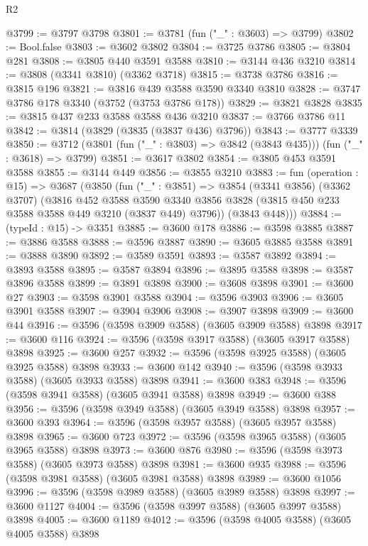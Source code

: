 \begin{lexlean}{R2}
\begin{coremodule}
@3799 := @3797 @3798
@3801 := @3781 (fun ("_" : @3603) => @3799)
@3802 := Bool.false
@3803 := @3602 @3802
@3804 := @3725 @3786
@3805 := @3804 @281
@3808 := @3805 @440 @3591 @3588
@3810 := @3144 @436 @3210
@3814 := @3808 (@3341 @3810) (@3362 @3718)
@3815 := @3738 @3786
@3816 := @3815 @196
@3821 := @3816 @439 @3588 @3590 @3340 @3810
@3828 := @3747 @3786 @178 @3340 (@3752 (@3753 @3786 @178))
@3829 := @3821 @3828
@3835 := @3815 @437 @233 @3588 @3588 @436 @3210
@3837 := @3766 @3786 @11
@3842 := @3814 (@3829 (@3835 (@3837 @436) @3796))
@3843 := @3777 @3339
@3850 := @3712 (@3801 (fun ("_" : @3803) => @3842 (@3843 @435))) (fun ("_" : @3618) => @3799)
@3851 := @3617 @3802
@3854 := @3805 @453 @3591 @3588
@3855 := @3144 @449
@3856 := @3855 @3210
@3883 := fun (operation : @15) =>
  @3687
    (@3850
      (fun ("_" : @3851) =>
      @3854
        (@3341 @3856)
        (@3362 @3707)
        (@3816
          @452
          @3588
          @3590
          @3340
          @3856
          @3828
          (@3815 @450 @233 @3588 @3588 @449 @3210 (@3837 @449) @3796))
        (@3843 @448)))
@3884 := (typeId : @15) -> @3351
@3885 := @3600 @178
@3886 := @3598 @3885
@3887 := @3886 @3588
@3888 := @3596 @3887
@3890 := @3605 @3885 @3588
@3891 := @3888 @3890
@3892 := @3589 @3591
@3893 := @3587 @3892
@3894 := @3893 @3588
@3895 := @3587 @3894
@3896 := @3895 @3588
@3898 := @3587 @3896 @3588
@3899 := @3891 @3898
@3900 := @3608 @3898
@3901 := @3600 @27
@3903 := @3598 @3901 @3588
@3904 := @3596 @3903
@3906 := @3605 @3901 @3588
@3907 := @3904 @3906
@3908 := @3907 @3898
@3909 := @3600 @44
@3916 := @3596 (@3598 @3909 @3588) (@3605 @3909 @3588) @3898
@3917 := @3600 @116
@3924 := @3596 (@3598 @3917 @3588) (@3605 @3917 @3588) @3898
@3925 := @3600 @257
@3932 := @3596 (@3598 @3925 @3588) (@3605 @3925 @3588) @3898
@3933 := @3600 @142
@3940 := @3596 (@3598 @3933 @3588) (@3605 @3933 @3588) @3898
@3941 := @3600 @383
@3948 := @3596 (@3598 @3941 @3588) (@3605 @3941 @3588) @3898
@3949 := @3600 @388
@3956 := @3596 (@3598 @3949 @3588) (@3605 @3949 @3588) @3898
@3957 := @3600 @393
@3964 := @3596 (@3598 @3957 @3588) (@3605 @3957 @3588) @3898
@3965 := @3600 @723
@3972 := @3596 (@3598 @3965 @3588) (@3605 @3965 @3588) @3898
@3973 := @3600 @876
@3980 := @3596 (@3598 @3973 @3588) (@3605 @3973 @3588) @3898
@3981 := @3600 @935
@3988 := @3596 (@3598 @3981 @3588) (@3605 @3981 @3588) @3898
@3989 := @3600 @1056
@3996 := @3596 (@3598 @3989 @3588) (@3605 @3989 @3588) @3898
@3997 := @3600 @1127
@4004 := @3596 (@3598 @3997 @3588) (@3605 @3997 @3588) @3898
@4005 := @3600 @1189
@4012 := @3596 (@3598 @4005 @3588) (@3605 @4005 @3588) @3898

\end{coremodule}
\end{lexlean}
